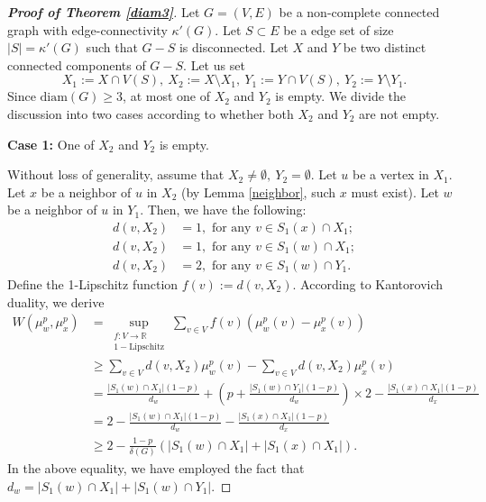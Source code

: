 \documentclass[10pt,a4paper]{article}
\theoremstyle{definition}
\theoremstyle{definition}
\theoremstyle{nonumber}
\begin{document}
\begin{proof}[\bf{Proof of Theorem \ref{diam3}}]
Let $G=(V,E)$ be a non-complete connected graph with edge-connectivity $\kappa'(G)$. Let $S \subset E$ be a edge set of size $|S| = \kappa'(G)$ such that $G - S$ is disconnected. Let $X$ and $Y$ be two distinct connected components of $G - S$.
Let us set
$$
X_1:=X\cap V(S),\ X_2:=X \setminus X_1,\ Y_1:=Y\cap V(S),\ Y_2:=Y \setminus Y_1.
$$
Since $\mathrm{diam}(G)\geq3$, at most one of $X_2$ and $Y_2$ is empty. We divide the discussion into two cases according to whether both $X_2$ and $Y_2$ are not empty.

\textbf{Case 1:} One of $X_2$ and $Y_2$ is empty.

Without loss of generality, assume that $X_2\ne\emptyset,\ Y_2=\emptyset$.
Let $u$ be a vertex in $X_1$. Let $x$ be a neighbor of $u$ in $X_2$ (by Lemma \ref{neighbor}, such $x$ must exist). Let $w$ be a neighbor of $u$ in $Y_1$. Then, we have the following:
\begin{align*} 
d(v, X_2) &= 1, \text{ for any } v \in S_1(x) \cap X_1;\\
d(v, X_2) &= 1, \text{ for any } v \in S_1(w) \cap X_1;\\
d(v, X_2) &= 2, \text{ for any } v \in S_1(w) \cap Y_1.
\end{align*}
Define the 1-Lipschitz function $f(v):=d(v, X_2)$. According to Kantorovich duality, we derive
\begin{align*}
W(\mu_w^p, \mu_x^p) &= \sup_{\substack{f: V \to \mathbb{R} \\ 1-\text{Lipschitz}}} \sum_{v \in V} f(v) \left( \mu_w^p(v) - \mu_x^p(v) \right)\\
&\geq \sum_{v \in V} d(v, X_2) \mu_w^p(v) - \sum_{v \in V} d(v, X_2) \mu_x^p(v)\\
&= \frac{|S_1(w) \cap X_1|(1-p)}{d_w} + \left( p + \frac{|S_1(w) \cap Y_1|(1-p)}{d_w} \right) \times 2 - \frac{|S_1(x) \cap X_1|(1-p)}{d_x}\\
&= 2 - \frac{|S_1(w) \cap X_1|(1-p)}{d_w} - \frac{|S_1(x) \cap X_1|(1-p)}{d_x}\\
&\geq 2 - \frac{1-p}{\delta(G)} \left( |S_1(w) \cap X_1| + |S_1(x) \cap X_1| \right).
\end{align*}
In the above equality, we have employed the fact that $d_w = |S_1(w) \cap X_1| + |S_1(w) \cap Y_1|$.


\end{proof}
\end{document}
